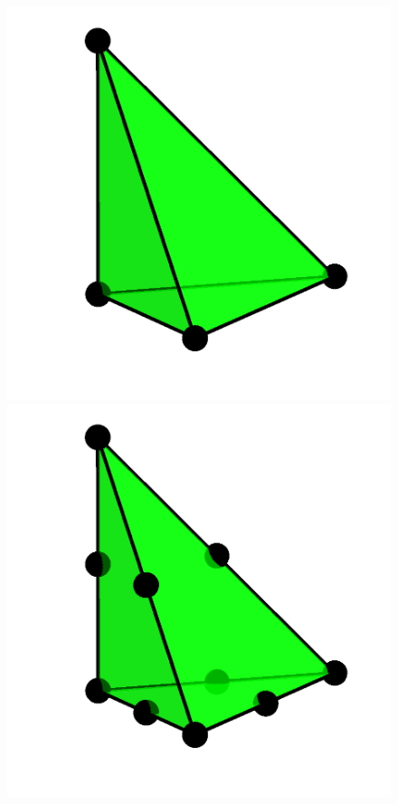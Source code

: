 \begin{figure}
  {\includegraphics[width=\threefigsfull]{chapters/kirby-6/png/CG1_3d.png}
   \includegraphics[width=\threefigsfull]{chapters/kirby-6/png/CG2_3d.png}
}
\end{figure}
